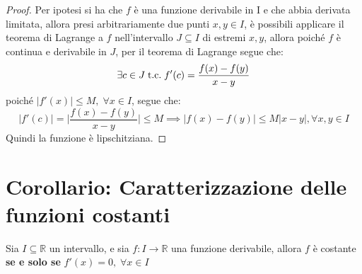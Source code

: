 \documentclass[a4paper,12pt,openright]{book}
\begin{document}
	\begin{proof}
		Per ipotesi si ha che $f$ è una funzione derivabile in I e che abbia derivata limitata, allora presi arbitrariamente due punti $x, y \in I$, è possibili applicare il teorema di Lagrange a $f$ nell'intervallo $J \subseteq I$ di estremi $x, y$, allora poiché $f$ è continua e derivabile in $J$, per il teorema di Lagrange segue che:
		\[\exists c \in J \;\text{t.c.}\; f'(c) = \frac{f(x) - f(y)}{x - y}\]
		poiché $|f'(x)| \leq M, \; \forall x \in I$, segue che:
		\[|f'(c)| = \big|\frac{f(x) - f(y)}{x - y}\big| \leq M \implies |f(x) - f(y)| \leq M|x - y|, \forall x,y \in I\]
		Quindi la funzione è lipschitziana.
	\end{proof}
	
	\newpage
	
	\section{Corollario: Caratterizzazione delle funzioni costanti}
	Sia $I \subseteq \mathbb{R}$ un intervallo, e sia $f: I \longrightarrow \mathbb{R}$ una funzione derivabile, allora $f$ è costante \textbf{se e solo se} $f'(x) = 0, \; \forall x \in I$
	
\end{document}
